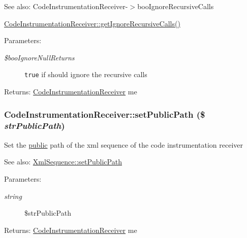 \begin{Desc}
\item[See also:]CodeInstrumentationReceiver-$>$booIgnoreRecursiveCalls 

\hyperlink{class_code_instrumentation_receiver_f5d40f3016b4d1b289a089b24eebbbe5}{CodeInstrumentationReceiver::getIgnoreRecursiveCalls()} \end{Desc}
\begin{Desc}
\item[Parameters:]
\begin{description}
\item[{\em \$booIgnoreNullReturns}]{\tt true} if should ignore the recursive calls \end{description}
\end{Desc}
\begin{Desc}
\item[Returns:]\hyperlink{class_code_instrumentation_receiver}{CodeInstrumentationReceiver} me \end{Desc}
\hypertarget{class_code_instrumentation_receiver_5a1555be1d4979c83dbdbacdfc31c679}{
\subsubsection[{setPublicPath}]{\setlength{\rightskip}{0pt plus 5cm}CodeInstrumentationReceiver::setPublicPath (\$ {\em strPublicPath})}}
\label{class_code_instrumentation_receiver_5a1555be1d4979c83dbdbacdfc31c679}


Set the \hyperlink{namespacepublic}{public} path of the xml sequence of the code instrumentation receiver

\begin{Desc}
\item[See also:]\hyperlink{class_xml_sequence_1b463d4b176c4798b8be4667262f0450}{XmlSequence::setPublicPath} \end{Desc}
\begin{Desc}
\item[Parameters:]
\begin{description}
\item[{\em string}]\$strPublicPath \end{description}
\end{Desc}
\begin{Desc}
\item[Returns:]\hyperlink{class_code_instrumentation_receiver}{CodeInstrumentationReceiver} me \end{Desc}


